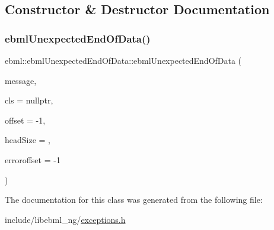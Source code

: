 \subsection{Constructor \& Destructor Documentation}
\mbox{\label{classebml_1_1ebmlUnexpectedEndOfData_a4320d2a636ca459b356e15d496cca5ef}} 
\subsubsection{\texorpdfstring{ebml\+Unexpected\+End\+Of\+Data()}{ebmlUnexpectedEndOfData()}}
{\footnotesize\ttfamily ebml\+::ebml\+Unexpected\+End\+Of\+Data\+::ebml\+Unexpected\+End\+Of\+Data (\begin{DoxyParamCaption}\item[{const std\+::string \&}]{message,  }\item[{const \mbox{\hyperlink{classebml_1_1ebmlElementClass}{ebml\+Element\+Class}} $\ast$}]{cls = {\ttfamily nullptr},  }\item[{off\+\_\+t}]{offset = {\ttfamily -\/1},  }\item[{unsigned char}]{head\+Size = {},  }\item[{off\+\_\+t}]{erroroffset = {\ttfamily -\/1} }\end{DoxyParamCaption})}



The documentation for this class was generated from the following file\+:\begin{DoxyCompactItemize}
\item 
include/libebml\+\_\+ng/\mbox{\hyperlink{exceptions_8h}{exceptions.\+h}}\end{DoxyCompactItemize}

